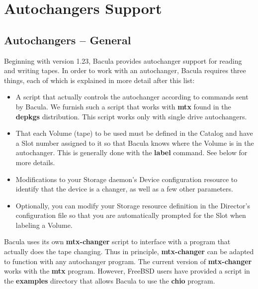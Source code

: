 
\section*{Autochangers Support}
\label{_ChapterStart18}

\subsection*{Autochangers -- General}

Beginning with version 1.23, Bacula provides autochanger support for reading
and writing tapes. In order to work with an autochanger, Bacula requires three
things, each of which is explained in more detail after this list: 

\begin{itemize}
\item A script that actually controls the autochanger according  to commands
   sent by Bacula. We furnish such a script  that works with {\bf mtx} found in
   the {\bf depkgs} distribution.  This script works only with single drive
autochangers.  
\item That each Volume (tape) to be used must be defined in the  Catalog and
   have a Slot number assigned  to it so that Bacula knows where the Volume is in
   the  autochanger. This is generally done with the {\bf label}  command. See
below for more details.  
\item Modifications to your Storage daemon's Device configuration  resource to
   identify that the device is a changer, as well  as a few other parameters.  
\item Optionally, you can modify your Storage resource definition  in the
   Director's configuration file so that you are automatically prompted for the
   Slot when labeling a Volume. 
\end{itemize}

Bacula uses its own {\bf mtx-changer} script to interface with a program
that actually does the tape changing. Thus in principle, {\bf mtx-changer} can
be adapted to function with any autochanger program. The current version of
{\bf mtx-changer} works with the {\bf mtx} program. However, FreeBSD users have
provided a script in the {\bf examples} directory that allows Bacula to use
the {\bf chio} program.

